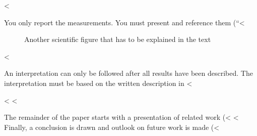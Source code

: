 \documentclass[runningheads,a4paper,english]{llncs}[2018/03/10]
\begin{document}
{%
<%

You only report the measurements. You must present and reference them (``<%

\begin{figure}
    \centering
    \caption{Another scientific figure that has to be explained in the text}
    \label{fig:my_label2}
\end{figure}

<%

An interpretation can only be followed after all results have been described. The interpretation must be based on the written description in <%

<%
<%
\label{sec:introduction}
\lipsum[1-3]

The remainder of the paper starts with a presentation of related work (<%
<%
Finally, a conclusion is drawn and outlook on future work is made (<%

}
\end{document}
